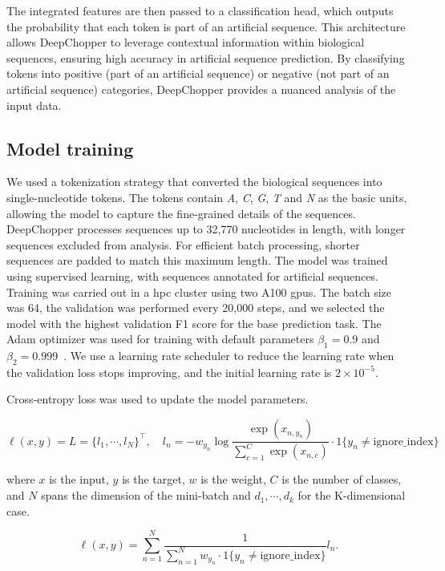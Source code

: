 \documentclass[pdflatex,sn-nature, lineno]{sn-jnl}%
\theoremstyle{thmstyleone}%
\theoremstyle{thmstyletwo}%
\theoremstyle{thmstylethree}%
\begin{document}
The integrated features are then passed to a classification head, which outputs the probability that each token is part of an artificial sequence.
This architecture allows DeepChopper to leverage contextual information within biological sequences, ensuring high accuracy in artificial sequence prediction.
By classifying tokens into positive (part of an artificial sequence) or negative (not part of an artificial sequence) categories, DeepChopper provides a nuanced analysis of the input data.


\subsection{Model training}\label{ssec:training}

We used a tokenization strategy that converted the biological sequences into single-nucleotide tokens.
The tokens contain \emph{A}, \emph{C}, \emph{G}, \emph{T} and \emph{N} as the basic units, allowing the model to capture the fine-grained details of the sequences.
DeepChopper processes sequences up to 32,770 nucleotides in length, with longer sequences excluded from analysis.
For efficient batch processing, shorter sequences are padded to match this maximum length.
The model was trained using supervised learning, with sequences annotated for artificial sequences.
Training was carried out in a \gls{hpc} cluster using two A100 \glspl{gpu}.
The batch size was 64, the validation was performed every 20,000 steps, and we selected the model with the highest validation F1 score for the base prediction task.
The Adam optimizer was used for training with default parameters \( \beta_{1} = 0.9 \) and \( \beta_{2} = 0.999 \)~\cite{kingma2014adam}.
We use a learning rate scheduler to reduce the learning rate when the validation loss stops improving, and the initial learning rate is \( 2 \times 10^{-5} \).

Cross-entropy loss was used to update the model parameters.

\[
	\ell(x, y) = L = \{l_1,\cdots,l_N\}^\top, \quad
	l_n = - w_{y_n} \log \frac{\exp(x_{n,y_n})}{\sum_{c=1}^C \exp(x_{n,c})}
	\cdot 1\{y_n \not= \textrm{ignore\_index}\}
\]

where \( x \) is the input, \( y \) is the target, \( w \) is the weight,
\( C \) is the number of classes, and \( N \) spans the dimension of the mini-batch and
\( d_1, \cdots, d_k \) for the K-dimensional case.

\[
	\ell(x, y) =   \sum_{n=1}^N \frac{1}{\sum_{n=1}^N w_{y_n} \cdot 1\{y_n \not= \textrm{ignore\_index}\}} l_n
	.\]
\end{document}
